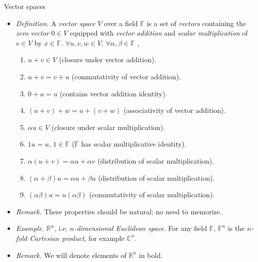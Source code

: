 \documentclass{beamer}
\numberwithin{equation}{section}
\begin{document}
\begin{frame}{Vector spaces}
    \begin{itemize}
        \item
        \textit{Definition.} A \textit{vector space} $ V $ over a field
        $ \mathbb{F} $ is a set of \textit{vectors} containing the
        \textit{zero vector} $ 0 \in V $ equipped with \textit{vector
        addition} and \textit{scalar multiplication} of $ v \in V $ by
        $ x \in \mathbb{F} $. $ \forall u, v, w \in V $, $ \forall \alpha,
        \beta \in \mathbb{F} $ \cite{jacob_linalg},
        \begin{enumerate}
            \item
            $ u + v \in V $ (closure under vector addition).

            \item
            $ u + v = v + u $ (commutativity of vector addition).

            \item
            $ 0 + u = u $ (contains vector addition identity).

            \item
            $ (u + v) + w = u + (v + w) $ (associativity of vector addition).

            \item
            $ \alpha u \in V $ (closure under scalar multiplication).

            \item
            $ 1u = u $, $ 1 \in \mathbb{F} $ ($ \mathbb{F} $ has scalar
            multiplicative identity).

            \item
            $ \alpha(u + v) = \alpha u + \alpha v $ (distribution of scalar
            multiplication).

            \item
            $ (\alpha + \beta)u  = \alpha u + \beta u $ (distribution of
            scalar multiplication).

            \item
            $ (\alpha\beta)u = u(\alpha\beta) $ (commutativity of scalar
            multiplication).
        \end{enumerate}

        \item
        \textit{Remark.} These properties should be natural; no need to
        memorize.

        \item
        \textit{Example.} $ \mathbb{R}^n $, i.e. $ n $\textit{-dimensional
        Euclidean space}. For any field $ \mathbb{F} $, $ \mathbb{F}^n $ is
        the $ n $\textit{-fold Cartesian product}, for example
        $ \mathbb{C}^n $.

        \item
        \textit{Remark.} We will denote elements of $ \mathbb{R}^n $ in bold.
    \end{itemize}
\end{frame}
\end{document}
